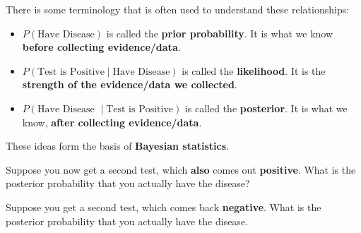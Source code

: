 %
\begin{frame}
There is some terminology that is often used to understand these relationships:

\begin{itemize}
\item $P(\text{Have Disease})$ is called the \textbf{prior probability}.  It is
what we know \textbf{before collecting evidence/data}.
\item $P(\text{Test is Positive} \mid \text{Have Disease})$ is called the
\textbf{likelihood}.  It is the \textbf{strength of the evidence/data we collected}.
\item $P(\text{Have Disease } \mid \text{Test is Positive})$ is called the
\textbf{posterior}.  It is what we know, \textbf{after collecting evidence/data}.
\end{itemize}

These ideas form the basis of \textbf{Bayesian statistics}.

\end{frame}
%

%
\begin{frame}
Suppose you now get a second test, which \textbf{also} comes out
\textbf{positive}. What is the posterior probability that you actually have the
disease?

\hfill

Suppose you get a second test, which comes back \textbf{negative}.  What is the
posterior probability that you actually have the disease.
\end{frame}

